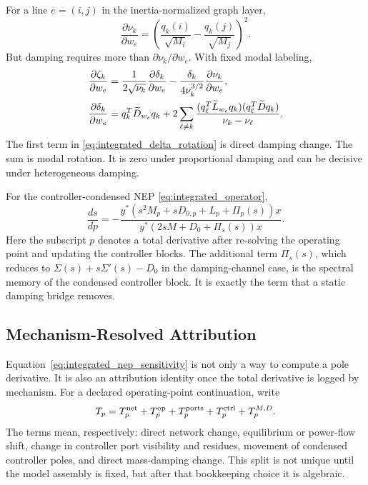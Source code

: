 For a line \(e=(i,j)\) in the inertia-normalized graph layer,
\begin{equation}
  \frac{\partial\nu_k}{\partial w_e}
  =
  \left(
  \frac{q_k(i)}{\sqrt{M_i}}-
  \frac{q_k(j)}{\sqrt{M_j}}
  \right)^2.
  \label{eq:integrated_line_nu}
\end{equation}
But damping requires more than \(\partial\nu_k/\partial w_e\). With fixed
modal labeling,
\begin{align}
  \frac{\partial \zeta_k}{\partial w_e}
  &=
  \frac{1}{2\sqrt{\nu_k}}\frac{\partial\delta_k}{\partial w_e}
  -
  \frac{\delta_k}{4\nu_k^{3/2}}
  \frac{\partial\nu_k}{\partial w_e},
  \label{eq:integrated_line_zeta}\\
  \frac{\partial\delta_k}{\partial w_e}
  &=
  q_k^T\widetilde D_{w_e}q_k
  +
  2\sum_{\ell\ne k}
  \frac{
    (q_\ell^T\widetilde L_{w_e}q_k)(q_\ell^T\widetilde D q_k)
  }{\nu_k-\nu_\ell}.
  \label{eq:integrated_delta_rotation}
\end{align}
The first term in \eqref{eq:integrated_delta_rotation} is direct damping
change. The sum is modal rotation. It is zero under proportional damping and
can be decisive under heterogeneous damping.

For the controller-condensed NEP \eqref{eq:integrated_operator},
\begin{equation}
  \frac{ds}{dp}
  =
  -
  \frac{
  y^*\left(s^2M_p+sD_{0,p}+L_p+\Pi_p(s)\right)x
  }{
  y^*\left(2sM+D_0+\Pi_s(s)\right)x
  }.
  \label{eq:integrated_nep_sensitivity}
\end{equation}
Here the subscript \(p\) denotes a total derivative after re-solving the
operating point and updating the controller blocks. The additional term
\(\Pi_s(s)\), which reduces to \(\Sigma(s)+s\Sigma'(s)-D_0\) in the
damping-channel case, is the spectral memory of the condensed controller block.
It is exactly the term that a static damping bridge removes.

\subsection{Mechanism-Resolved Attribution}

Equation~\eqref{eq:integrated_nep_sensitivity} is not only a way to compute a
pole derivative. It is also an attribution identity once the total derivative
is logged by mechanism. For a declared operating-point continuation, write
\begin{equation}
  T_p
  =
  T_p^{\rm net}
  +T_p^{\rm op}
  +T_p^{\rm ports}
  +T_p^{\rm ctrl}
  +T_p^{M,D}.
  \label{eq:mechanism_tp_split}
\end{equation}
The terms mean, respectively: direct network change, equilibrium or power-flow
shift, change in controller port visibility and residues, movement of
condensed controller poles, and direct mass-damping change. This split is not
unique until the model assembly is fixed, but after that bookkeeping choice it
is algebraic.

